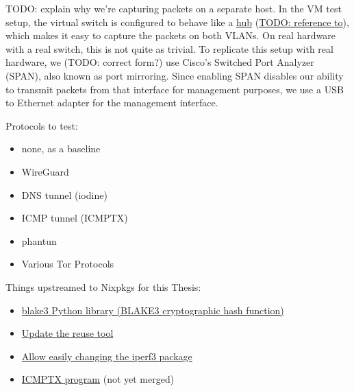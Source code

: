 TODO: explain why we're capturing packets on a separate host.
In the VM test setup, the virtual switch is configured to behave like a \href{https://en.wikipedia.org/wiki/Ethernet_hub}{hub} (\href{https://github.com/NixOS/nixpkgs/blob/0634959ae9c75ac8cab28dfcc9a0f045cf30dfc6/nixos/lib/test-driver/test_driver/vlan.py#L43}{TODO: reference to}), which makes it easy to capture the packets on both VLANs. On real hardware with a real switch, this is not quite as trivial. To replicate this setup with real hardware, we (TODO: correct form?) use Cisco's Switched Port Analyzer (SPAN), also known as port mirroring. Since enabling SPAN disables our ability to transmit packets from that interface for management purposes, we use a USB to Ethernet adapter for the management interface.

Protocols to test:
\begin{itemize}
  \item none, as a baseline
  \item WireGuard
  \item DNS tunnel (iodine)
  \item ICMP tunnel (ICMPTX)
  \item phantun
  \item Various Tor Protocols
\end{itemize}


Things upstreamed to Nixpkgs for this Thesis:
\begin{itemize}
  \item \href{https://github.com/NixOS/nixpkgs/pull/343277}{blake3 Python library (BLAKE3 cryptographic hash function)}
  \item \href{https://github.com/NixOS/nixpkgs/pull/281636}{Update the reuse tool}
  \item \href{https://github.com/NixOS/nixpkgs/pull/333462}{Allow easily changing the iperf3 package}
  \item \href{https://github.com/NixOS/nixpkgs/pull/357574}{ICMPTX program} (not yet merged)
\end{itemize}

